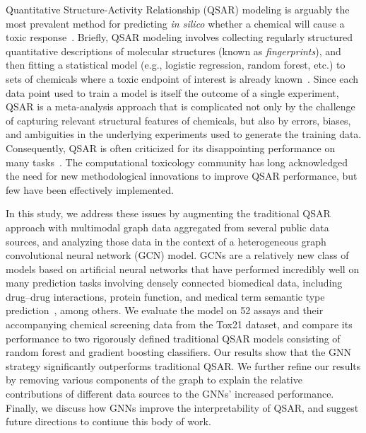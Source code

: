 \documentclass{ws-procs11x85}
\begin{document}
Quantitative Structure-Activity Relationship (QSAR) modeling is arguably the most prevalent method for predicting \textit{in silico} whether a chemical will cause a toxic response~\cite{dudek2006computational}.
Briefly, QSAR modeling involves collecting regularly structured quantitative descriptions of molecular structures (known as \textit{fingerprints}), and then fitting a statistical model (e.g., logistic regression, random forest, etc.) to sets of chemicals where a toxic endpoint of interest is already known~\cite{tropsha2010best,hansch1964p}.
Since each data point used to train a model is itself the outcome of a single experiment, QSAR is a meta-analysis approach that is complicated not only by the challenge of capturing relevant structural features of chemicals, but also by errors, biases, and ambiguities in the underlying experiments used to generate the training data.
Consequently, QSAR is often criticized for its disappointing performance on many tasks~\cite{cherkasov2014qsar,maggiora2006outliers}.
The computational toxicology community has long acknowledged the need for new methodological innovations to improve QSAR performance, but few have been effectively implemented.

In this study, we address these issues by augmenting the traditional QSAR approach with multimodal graph data aggregated from several public data sources, and analyzing those data in the context of a heterogeneous graph convolutional neural network (GCN) model.
GCNs are a relatively new class of models based on artificial neural networks that have performed incredibly well on many prediction tasks involving densely connected biomedical data, including drug--drug interactions, protein function, and medical term semantic type prediction~\cite{yue2020graph}, among others.
We evaluate the model on 52 assays and their accompanying chemical screening data from the Tox21 dataset, and compare its performance to two rigorously defined traditional QSAR models consisting of random forest and gradient boosting classifiers.
Our results show that the GNN strategy significantly outperforms traditional QSAR.
We further refine our results by removing various components of the graph to explain the relative contributions of different data sources to the GNNs' increased performance.
Finally, we discuss how GNNs improve the interpretability of QSAR, and suggest future directions to continue this body of work.
\end{document}
